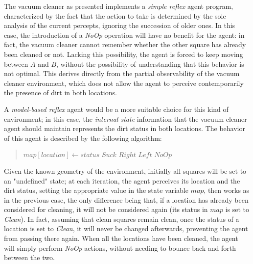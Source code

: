 \documentclass[letterpaper,headings=standardclasses]{scrartcl}
\begin{document}
The vacuum cleaner as presented implements a \emph{simple reflex} agent program, characterized by the fact that the action to take is determined by the sole analysis of the current percepts, ignoring the succession of older ones. In this case, the introduction of a \emph{NoOp} operation will have no benefit for the agent: in fact, the vacuum cleaner cannot remember whether the other square has already been cleaned or not. Lacking this possibility, the agent is forced to keep moving between $A$ and $B$, without the possibility of understanding that this behavior is not optimal. This derives directly from the partial observability of the vacuum cleaner environment, which does not allow the agent to perceive contemporarily the presence of dirt in both locations.

A \emph{model-based reflex} agent would be a more suitable choice for this kind of environment; in this case, the \emph{internal state} information that the vacuum cleaner agent should maintain represents the dirt status in both locations. The behavior of this agent is described by the following algorithm:

\begin{quote}
\begin{algorithmic}

  \State $map[location] \gets status$
   \Return $Suck$
   \Return $Right$
   \Return $Left$
  \Else{} \Return $NoOp$
  \EndIf
\EndFunction

\end{algorithmic}
\end{quote}

Given the known geometry of the environment, initially all squares will be set to an "undefined" state; at each iteration, the agent perceives its location and the dirt status, setting the appropriate value in the state variable $map$, then works as in the previous case, the only difference being that, if a location has already been considered for cleaning, it will not be considered again (its status in $map$ is set to \emph{Clean}). In fact, assuming that clean squares remain clean, once the status of a location is set to \emph{Clean}, it will never be changed afterwards, preventing the agent from passing there again. When all the locations have been cleaned, the agent will simply perform \emph{NoOp} actions, without needing to bounce back and forth between the two.
\end{document}
